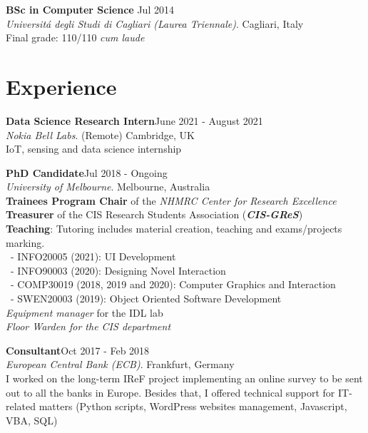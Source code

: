 \documentclass[margin]{res}
\begin{document}
\begin{resume}
\textbf{BSc in Computer Science} \hfill Jul 2014 \\
\textit{Universit\'{a} degli Studi di Cagliari (Laurea Triennale)}. Cagliari, Italy
\\Final grade: 110/110 \textit{cum laude}



\section{Experience}

\textbf{Data Science Research Intern}\hfill{June 2021 - August 2021}\\
\textit{Nokia Bell Labs}. (Remote) Cambridge, UK\\
IoT, sensing and data science internship

\textbf{PhD Candidate}\hfill{Jul 2018 - Ongoing}\\
\textit{University of Melbourne}. Melbourne, Australia\\
\textbullet{} \textbf{Trainees Program Chair} of the \textit{NHMRC Center for Research Excellence}\\
\textbullet{} \textbf{Treasurer} of the CIS Research Students Association (\textit{\textbf{CIS-GReS}})\\
\textbullet{} \textbf{Teaching}: Tutoring includes material creation, teaching and exams/projects marking.
\\\ - INFO20005 (2021): UI Development
\\\ - INFO90003 (2020): Designing Novel Interaction
\\\ - COMP30019 (2018, 2019 and 2020): Computer Graphics and Interaction
\\\ - SWEN20003 (2019): Object Oriented Software Development\\
\textbullet{} \textit{Equipment manager} for the IDL lab\\
\textbullet{} \textit{Floor Warden for the CIS department}

\textbf{Consultant}\hfill{Oct 2017 - Feb 2018}\\
 \textit{European Central Bank (ECB)}. Frankfurt, Germany\\
I worked on the long-term IReF project implementing an online survey to be sent out to all the banks in Europe. Besides that, I offered technical support for IT-related matters (Python scripts, WordPress websites management, Javascript, VBA, SQL)



\end{resume}
\end{document}
